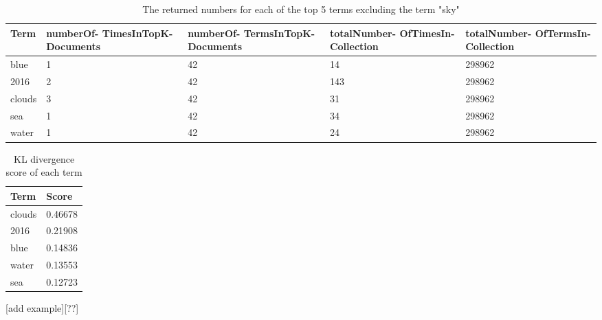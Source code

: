 \begin{table}
	\centering
    \begin{tabular}{l|p{30mm}|p{30mm}|p{30mm}|p{30mm}}
    Term   & numberOf- \newline TimesInTopK- \newline Documents &
	numberOf- \newline TermsInTopK- \newline Documents &
	totalNumber- \newline OfTimesIn- \newline Collection &
	totalNumber- \newline OfTermsIn- \newline Collection \\ \hline
    blue   & 1                            & 42                           & 14                             & 298962                         \\ \hline
    2016   & 2                            & 42                           & 143                            & 298962                         \\ \hline
    clouds & 3                            & 42                           & 31                             & 298962                         \\ \hline
    sea    & 1                            & 42                           & 34                             & 298962                         \\ \hline
    water  & 1                            & 42                           & 24                             & 298962                         \\ \hline
\end{tabular}
	\label{tbl:kl-counts}
	\caption{The returned numbers for each of the top 5 terms excluding the term "sky"}
\end{table}

\begin{table}
	\centering
    \begin{tabular}{l|l}
    Term   & Score   \\ \hline
    clouds & 0.46678 \\ \hline
    2016   & 0.21908 \\ \hline
    blue   & 0.14836 \\ \hline
    water  & 0.13553 \\ \hline
    sea    & 0.12723 \\ \hline
    \end{tabular}
	\label{tbl:kl-score}
	\caption{KL divergence score of each term}
\end{table}

[add example][??]
